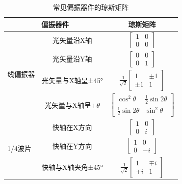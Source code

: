 \documentclass[type=master,oneside]{fduthesis}
\begin{document}
\begin{table}[htb]
  \centering
  \caption{常见偏振器件的琼斯矩阵}
  \label{tab:常见偏振器件的琼斯矩阵}
  \begin{tabular}{ccc}
    \multicolumn{2}{c}{偏振器件}                 & 琼斯矩阵                                                                                       \\ \hline
    \multirow{4}{*}{线偏振器}                    & 光矢量沿X轴                & $\left[\begin{array}{cc}1 & 0 \\ 0 & 0\end{array}\right]$                     \\
                                                 & 光矢量沿Y轴                & $\left[\begin{array}{cc}0 & 0 \\ 0 & 1\end{array}\right]$                     \\
                                                 & 光矢量与X轴呈±45°          & $\frac{1}{\sqrt{2}}\left[\begin{array}{cc}1 & \pm 1 \\ \pm 1 & 1\end{array}\right]$   \\
                                                 & 光矢量与X轴呈$\pm \theta $ & $\left[\begin{array}{cc}\cos ^{2} \theta & \frac{1}{2} \sin 2 \theta \\ \frac{1}{2} \sin 2 \theta & \sin ^{2} \theta\end{array}\right]$                     \\ \hline
    \multicolumn{1}{l}{\multirow{3}{*}{1/4波片}} & 快轴在X方向                & $\left[\begin{array}{cc}1 & 0 \\ 0 & i\end{array}\right]$                    \\
    \multicolumn{1}{l}{}                         & 快轴在Y方向                & $\left[\begin{array}{cc}1 & 0 \\ 0 & -i\end{array}\right]$                    \\
    \multicolumn{1}{l}{}                         & 快轴与X轴夹角±45°          & $\frac{1}{\sqrt{2}}\left[\begin{array}{cc}1 & \mp i \\  \mp i & 1\end{array}\right] $ \\ \hline
  \end{tabular}
\end{table}
\end{document}
